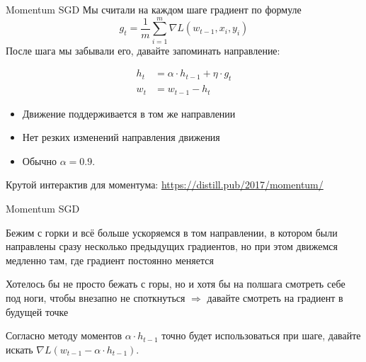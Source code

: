 \documentclass[notes,12pt, aspectratio=169]{beamer}
\newenvironment{wideitemize}{\itemize\addtolength{\itemsep}{10pt}}{\enditemize}
\begin{document}
\begin{frame}{Momentum SGD}
Мы считали на каждом шаге градиент по формуле  \[g_t =\frac{1}{m}\sum_{i=1}^m  \nabla L(w_{t-1}, x_i, y_i)\] После шага мы забывали его, {\color{red} давайте запоминать направление:} 

\begin{equation*}
\begin{aligned}
h_t &= \alpha \cdot h_{t-1} + \eta \cdot g_t \\
w_t &= w_{t-1} - h_t
\end{aligned}	
\end{equation*}

\begin{itemize}
\item Движение поддерживается в том же направлении
\item Нет резких изменений направления движения
\item Обычно $\alpha = 0.9$.
\end{itemize}
\vfill
\footnotesize
Крутой интерактив для моментума: {\color{blue} \url{https://distill.pub/2017/momentum/}}
\end{frame}


\begin{frame}{Momentum SGD}
\begin{wideitemize}
\item Бежим с горки и всё больше ускоряемся в том направлении, в котором были направлены сразу несколько предыдущих градиентов, но при этом движемся медленно там, где градиент постоянно меняется
\item Хотелось бы не просто бежать с горы, но и хотя бы на полшага смотреть себе под ноги, чтобы внезапно не споткнуться $\Rightarrow$  \alert{давайте смотреть на градиент в будущей точке}
\item Согласно методу моментов $\alpha \cdot h_{t-1}$ точно будет использоваться при шаге, давайте искать $\nabla L(w_{t-1} - \alpha \cdot h_{t-1})$.
\end{wideitemize}
\end{frame}
\end{document}
